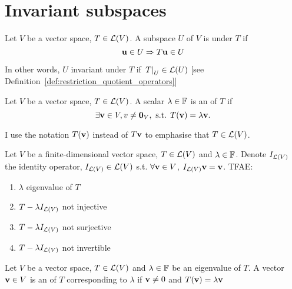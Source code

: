 \documentclass[aspectratio=169]{beamer}
\begin{document}
\section{Invariant subspaces}


\begin{frame}[fragile]
\begin{definition}\label{def:invariant_subspace}
Let $V$ be a vector space, $T\in\mathcal{L}(V)$. A subspace $U$ of $V$ is  under $T$ if
\[
\mathbf{u}\in U\Rightarrow T\mathbf{u}\in U
\]
\end{definition}

In other words, $U$ invariant under $T$ if $\left.T\right|_{U}\in\mathcal{L}(U)$ [see Definition~\ref{def:restriction_quotient_operators}]

\begin{definition}[Eigenvalue]
Let $V$ be a vector space, $T\in\mathcal{L}(V)$. A scalar $\lambda\in\mathbb{F}$ is an  of $T$ if
\[
\exists\bv\in V, v\neq\b0_V,\textrm{ s.t. }T(\bv)=\lambda\bv.
\]
\end{definition}
I use the notation $T(\mathbf{v})$ instead of $T\mathbf{v}$ to emphasise that $T\in\mathcal{L}(V)$.
\end{frame}

\begin{frame}
\begin{theorem}
Let $V$ be a finite-dimensional vector space, $T\in\mathcal{L}(V)$ and $\lambda\in\mathbb{F}$. Denote $I_{\mathcal{L}(V)}$ the identity operator, $I_{\mathcal{L}(V)}\in\mathcal{L}(V)$ s.t. $\forall \mathbf{v}\in V$, $I_{\mathcal{L}(V)}\mathbf{v}=\mathbf{v}$. TFAE:
\begin{enumerate}
\item $\lambda$ eigenvalue of $T$
\item $T-\lambda I_{\mathcal{L}(V)}$ not injective
\item $T-\lambda I_{\mathcal{L}(V)}$ not surjective
\item $T-\lambda I_{\mathcal{L}(V)}$ not invertible
\end{enumerate}
\end{theorem}
\vfill
\begin{definition}[Eigenvector]
Let $V$ be a vector space, $T\in\mathcal{L}(V)$ and $\lambda\in\mathbb{F}$ be an eigenvalue of $T$. A vector $\mathbf{v}\in V$ is an  of $T$ corresponding to $\lambda$ if $\mathbf{v}\neq 0$ and $T(\mathbf{v})=\lambda\mathbf{v}$
\end{definition}
\end{frame}
\end{document}

